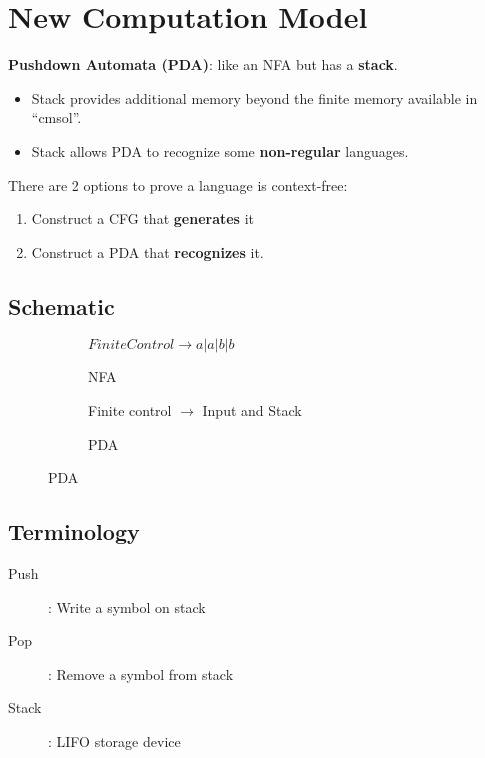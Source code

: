 \documentclass{article}
\begin{document}
\section*{New Computation Model}

\textbf{Pushdown Automata (PDA)}: like an NFA but has a
\textbf{stack}.

\begin{itemize}
\item Stack provides additional memory beyond the finite memory
  available in ``cmsol''.
\item Stack allows PDA to recognize some \textbf{non-regular}
  languages.
\end{itemize}

There are 2 options to prove a language is context-free:

\begin{enumerate}
\item Construct a CFG that \textbf{generates} it
\item Construct a PDA that \textbf{recognizes} it.
\end{enumerate}

\subsection*{Schematic}

\begin{figure}[H]
  \centering
  \begin{subfigure}{.5\textwidth}
    \centering
    $\boxed{Finite Control}\rightarrow\boxed{a|a|b|b}$
    \caption{NFA}
  \end{subfigure}%
  \begin{subfigure}{.5\textwidth}
    \centering
    Finite control $\rightarrow$ Input and Stack
    \caption{PDA}
  \end{subfigure}
\end{figure}

\subsection*{Terminology}

\begin{description}
\item[Push]: Write a symbol on stack
\item[Pop]: Remove a symbol from stack
\item[Stack]: LIFO storage device
\end{description}
\end{document}
